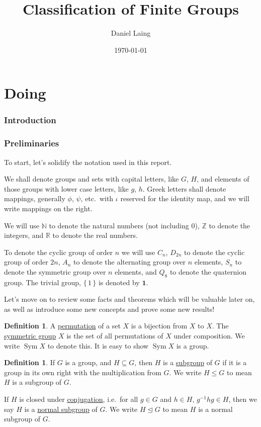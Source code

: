 \documentclass[a4paper, oneside, 12pt, final]{article}
\title{Classification of Finite Groups}
\author{Daniel Laing}
\date{\today}
\renewcommand{\emph}{\underline}
\theoremstyle{definition}
\newtheorem{definition}[theorem]{Definition}
\DeclareMathOperator{\Sym}{Sym}
\newcommand{\nrmsgp}{\unlhd}
\newcommand{\Z}{\mathbb{Z}}
\newcommand{\R}{\mathbb{R}}
\newcommand{\N}{\mathbb{N}}
\begin{document}
{\maketitle}
{\tableofcontents}

\part{Doing}

\section{Introduction}

\section{Preliminaries}
To start, let's solidify the notation used in this report.

We shall denote groups and sets with capital letters, like \(G\), \(H\), and elements of those groups with lower case
letters, like \(g\), \(h\).
Greek letters shall denote mappings, generally \(\phi\), \(\psi\), etc.\ with \(\iota\) reserved for the identity map,
and we will write mappings on the right.

We will use \(\N\) to denote the natural numbers (not including 0), \(\Z\) to denote the integers, and \(\R\) to denote
the real numbers.

To denote the cyclic group of order \(n\) we will use \(C_n\), \(D_{2n}\) to denote the cyclic group of order \(2n\),
\(A_n\) to denote the alternating group over \(n\) elements, \(S_n\) to denote the symmetric group over \(n\)
elements, and \(Q_8\) to denote the quaternion group.
The trivial group, \(\{\, 1\, \}\) is denoted by \(\bm{1}\).

Let's move on to review some facts and theorems which will be valuable later on, as well as introduce some new concepts
and prove some new results!

\begin{definition}
    A \emph{permutation} of a set \(X\) is a bijection from \(X\) to \(X\).
    The \emph{symmetric group} \(X\) is the set of all permutations of \(X\) under composition.
    We write \(\Sym{X}\) to denote this.
    It is easy to show \(\Sym{X}\) is a group.
\end{definition}



\begin{definition}
    If \(G\) is a group, and \(H \subseteq G\), then \(H\) is a \emph{subgroup} of \(G\) if it is a group in its own right with
    the multiplication from \(G\).
    We write \(H \leqslant G\) to mean \(H\) is a subgroup of \(G\).

    If \(H\) is closed under \emph{conjugation}, i.e.\ for all \(g \in G\) and \(h \in H\), \(g^{-1}hg \in H\), then we
    say \(H\) is a \emph{normal subgroup} of \(G\).
    We write \(H \nrmsgp G\) to mean \(H\) is a normal subgroup of \(G\).
\end{definition}
\end{document}
